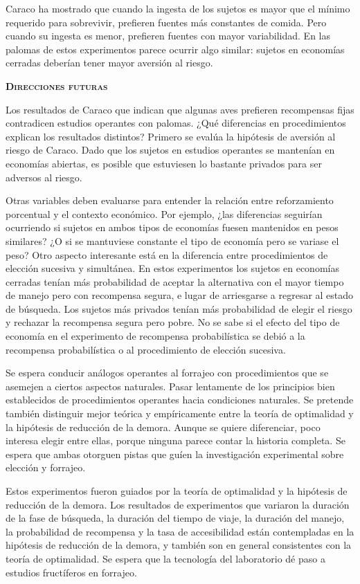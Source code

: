 \documentclass[a4paper,12pt]{article}
\begin{document}
Caraco ha mostrado que cuando la ingesta de los sujetos es mayor que el mínimo requerido para sobrevivir, prefieren fuentes más constantes de comida. Pero cuando su ingesta es menor, prefieren fuentes con mayor variabilidad. En las palomas de estos experimentos parece ocurrir algo similar: sujetos en economías cerradas deberían tener mayor aversión al riesgo.

{\scshape\bfseries Direcciones futuras}

Los resultados de Caraco que indican que algunas aves prefieren recompensas fijas contradicen estudios operantes con palomas. ¿Qué diferencias en procedimientos explican los resultados distintos? Primero se evalúa la hipótesis de aversión al riesgo de Caraco. Dado que los sujetos en estudios operantes se mantenían en economías abiertas, es posible que estuviesen lo bastante privados para ser adversos al riesgo. 

Otras variables deben evaluarse para entender la relación entre reforzamiento porcentual y el contexto económico. Por ejemplo, ¿las diferencias seguirían ocurriendo si sujetos en ambos tipos de economías fuesen mantenidos en pesos similares? ¿O si se mantuviese constante el tipo de economía pero se variase el peso? Otro aspecto interesante está en la diferencia entre procedimientos de elección sucesiva y simultánea. En estos experimentos los sujetos en economías cerradas tenían más probabilidad de aceptar la alternativa con el mayor tiempo de manejo pero con recompensa segura, e lugar de arriesgarse a regresar al estado de búsqueda. Los sujetos más privados tenían más probabilidad de elegir el riesgo y rechazar la recompensa segura pero pobre. No se sabe si el efecto del tipo de economía en el experimento de recompensa probabilística se debió a la recompensa probabilística o al procedimiento de elección sucesiva.

Se espera conducir análogos operantes al forrajeo con procedimientos que se asemejen a ciertos aspectos naturales. Pasar lentamente de los principios bien establecidos de procedimientos operantes hacia condiciones naturales. Se pretende también distinguir mejor teórica y empíricamente entre la teoría de optimalidad y la hipótesis de reducción de la demora. Aunque se quiere diferenciar, poco interesa elegir entre ellas, porque ninguna parece contar la historia completa. Se espera que ambas otorguen pistas que guíen la investigación experimental sobre elección y forrajeo.

Estos experimentos fueron guiados por la teoría de optimalidad y la hipótesis de reducción de la demora. Los resultados de experimentos que variaron la duración de la fase de búsqueda, la duración del tiempo de viaje, la duración del manejo, la probabilidad de recompensa y la tasa de accesibilidad están contempladas en la hipótesis de reducción de la demora, y también son en general consistentes con la teoría de optimalidad. Se espera que la tecnología del laboratorio dé paso a estudios fructíferos en forrajeo.
\end{document}
